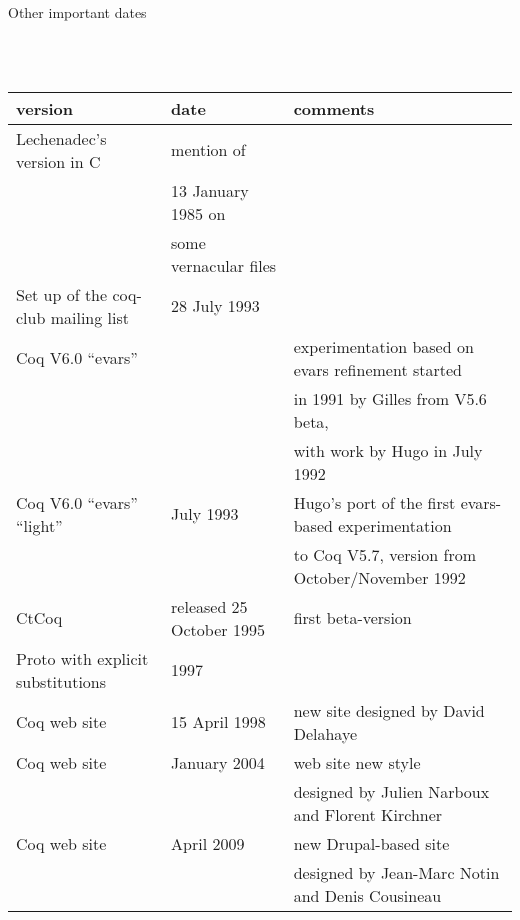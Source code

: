 \documentclass[a4paper]{book}
\begin{document}
\medskip
\bigskip
\newpage

\centerline{\large Other important dates}
\mbox{}\\
\mbox{}\\
\begin{tabular}{l|l|l}
version & date & comments \\
\hline
Lechenadec's version in C& mention of \\
 & 13 January 1985 on \\
 & some vernacular files\\
Set up of the coq-club mailing list & 28 July 1993\\

Coq V6.0 ``evars'' & & experimentation based on evars
refinement started \\
  & & in 1991 by Gilles from V5.6 beta,\\
  & & with work by Hugo in July 1992\\

Coq V6.0 ``evars'' ``light'' & July 1993 & Hugo's port of the first
evars-based experimentation \\
 & & to Coq V5.7, version from October/November
1992\\

CtCoq & released 25 October 1995 & first beta-version  \\ %

Proto with explicit substitutions & 1997 &\\

Coq web site & 15 April 1998 & new site designed by David Delahaye \\

Coq web site & January 2004 & web site new style \\
  & & designed by Julien Narboux and Florent Kirchner \\

Coq web site & April 2009 & new Drupal-based site \\
  & & designed by Jean-Marc Notin and Denis Cousineau \\

\end{tabular}
\end{document}
